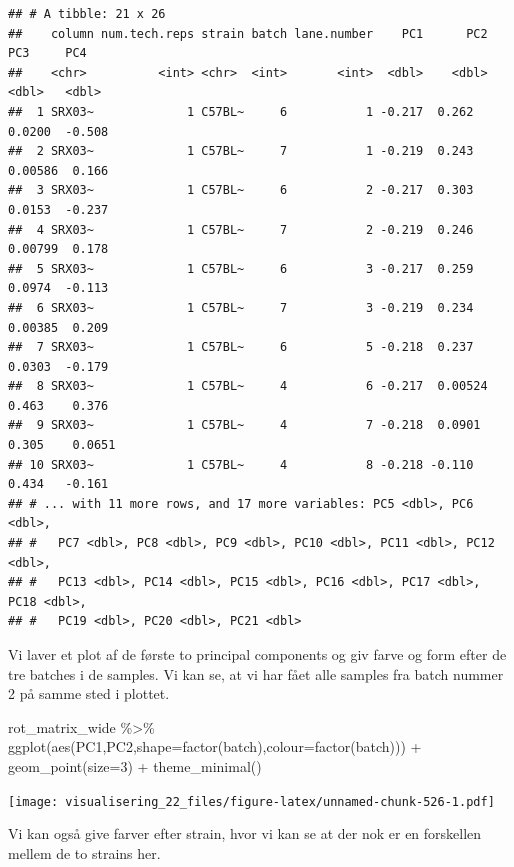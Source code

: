 \documentclass[
]{book}
\newenvironment{Shaded}{\begin{snugshade}}{\end{snugshade}}
\newcommand{\AttributeTok}[1]{\textcolor[rgb]{0.77,0.63,0.00}{#1}}
\newcommand{\DecValTok}[1]{\textcolor[rgb]{0.00,0.00,0.81}{#1}}
\newcommand{\FunctionTok}[1]{\textcolor[rgb]{0.00,0.00,0.00}{#1}}
\newcommand{\NormalTok}[1]{#1}
\newcommand{\SpecialCharTok}[1]{\textcolor[rgb]{0.00,0.00,0.00}{#1}}
\begin{document}
\begin{verbatim}
## # A tibble: 21 x 26
##    column num.tech.reps strain batch lane.number    PC1      PC2     PC3     PC4
##    <chr>          <int> <chr>  <int>       <int>  <dbl>    <dbl>   <dbl>   <dbl>
##  1 SRX03~             1 C57BL~     6           1 -0.217  0.262   0.0200  -0.508 
##  2 SRX03~             1 C57BL~     7           1 -0.219  0.243   0.00586  0.166 
##  3 SRX03~             1 C57BL~     6           2 -0.217  0.303   0.0153  -0.237 
##  4 SRX03~             1 C57BL~     7           2 -0.219  0.246   0.00799  0.178 
##  5 SRX03~             1 C57BL~     6           3 -0.217  0.259   0.0974  -0.113 
##  6 SRX03~             1 C57BL~     7           3 -0.219  0.234   0.00385  0.209 
##  7 SRX03~             1 C57BL~     6           5 -0.218  0.237   0.0303  -0.179 
##  8 SRX03~             1 C57BL~     4           6 -0.217  0.00524 0.463    0.376 
##  9 SRX03~             1 C57BL~     4           7 -0.218  0.0901  0.305    0.0651
## 10 SRX03~             1 C57BL~     4           8 -0.218 -0.110   0.434   -0.161 
## # ... with 11 more rows, and 17 more variables: PC5 <dbl>, PC6 <dbl>,
## #   PC7 <dbl>, PC8 <dbl>, PC9 <dbl>, PC10 <dbl>, PC11 <dbl>, PC12 <dbl>,
## #   PC13 <dbl>, PC14 <dbl>, PC15 <dbl>, PC16 <dbl>, PC17 <dbl>, PC18 <dbl>,
## #   PC19 <dbl>, PC20 <dbl>, PC21 <dbl>
\end{verbatim}

Vi laver et plot af de første to principal components og giv farve og form efter de tre batches i de samples. Vi kan se, at vi har fået alle samples fra batch nummer 2 på samme sted i plottet.

\begin{Shaded}
\begin{Highlighting}[]
\NormalTok{rot\_matrix\_wide }\SpecialCharTok{\%\textgreater{}\%}
  \FunctionTok{ggplot}\NormalTok{(}\FunctionTok{aes}\NormalTok{(PC1,PC2,}\AttributeTok{shape=}\FunctionTok{factor}\NormalTok{(batch),}\AttributeTok{colour=}\FunctionTok{factor}\NormalTok{(batch))) }\SpecialCharTok{+} 
  \FunctionTok{geom\_point}\NormalTok{(}\AttributeTok{size=}\DecValTok{3}\NormalTok{) }\SpecialCharTok{+}
  \FunctionTok{theme\_minimal}\NormalTok{()}
\end{Highlighting}
\end{Shaded}

\texttt{[image: visualisering\_22\_files/figure-latex/unnamed-chunk-526-1.pdf]}

Vi kan også give farver efter strain, hvor vi kan se at der nok er en forskellen mellem de to strains her.
\end{document}
